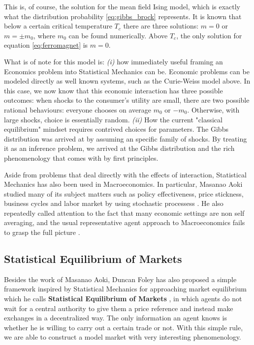 This is, of course, the solution for the mean field Ising model, which is exactly what the distribution probability \eqref{eq:gibbs_brock} represents. It is known that below a certain critical temperature $T_c$ there are three solutions: $m=0$ or $m = \pm m_0$, where $m_0$ can be found numerically. Above $T_c$, the only solution for equation \eqref{eq:ferromagnet} is $m=0$.

What is of note for this model is: \emph{(i)} how immediately useful framing an Economics problem into Statistical Mechanics can be. Economic problems can be modeled directly as well known systems, such as the Curie-Weiss model above. In this case, we now know that this economic interaction has three possible outcomes: when shocks to the consumer's utility are small, there are two possible rational behaviours: everyone chooses on average $m_0$ or $-m_0$. Otherwise, with large shocks, choice is essentially random. \emph{(ii)} How the current "classical equilibrium" mindset requires contrived choices for parameters. The Gibbs distribution was arrived at by assuming an specific family of shocks. By treating it as an inference problem, we arrived at the Gibbs distribution and the rich phenomenology that comes with by first principles.

Aside from problems that deal directly with the effects of interaction, Statistical Mechanics has also been used in Macroeconomics. In particular, Masanao Aoki studied many of its subject matters such as policy effectiveness, price stickness, business cycles and labor market by using stochastic processess \cite{AokiBook1, AokiBook2, AokiBook3}. He also repeatedly called attention to the fact that many economic settings are non self averaging, and the usual representative agent approach to Macroeconomics fails to grasp the full picture \cite{AokiSelfAvg}. 

\subsection{Statistical Equilibrium of Markets}

Besides the work of Masanao Aoki, Duncan Foley has also proposed a simple framework inspired by Statistical Mechanics for approaching market equilibrium which he calls \textbf{Statistical Equilibrium of Markets} \cite{Foley94, Foley96}, in which agents do not wait for a central authority to give them a price reference and instead make exchanges in a decentralized way. The only information an agent knows is whether he is willing to carry out a certain trade or not. With this simple rule, we are able to construct a model market with very interesting phenomenology.

